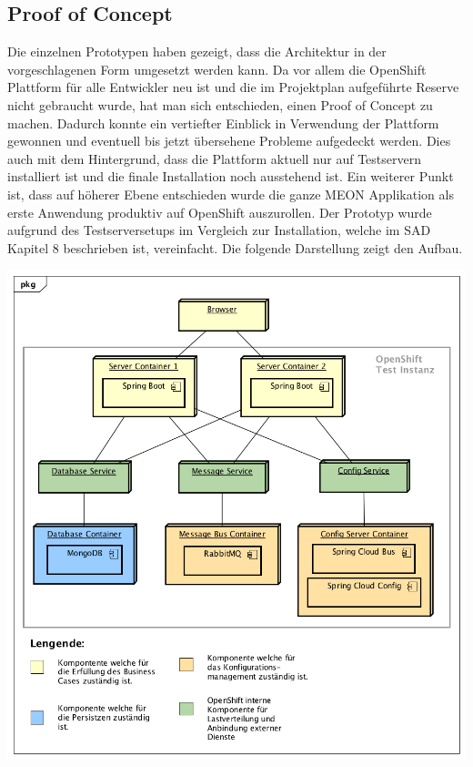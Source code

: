 \subsection{Proof of Concept}

Die einzelnen Prototypen haben gezeigt, dass die Architektur in der vorgeschlagenen Form umgesetzt werden kann. Da vor allem die OpenShift Plattform für alle Entwickler neu ist und die im Projektplan aufgeführte Reserve nicht gebraucht wurde, hat man sich entschieden, einen Proof of Concept zu machen. Dadurch konnte ein vertiefter Einblick in Verwendung der Plattform gewonnen und eventuell bis jetzt übersehene Probleme aufgedeckt werden. Dies auch mit dem Hintergrund, dass die Plattform aktuell nur auf Testservern installiert ist und die finale Installation noch ausstehend ist. Ein weiterer Punkt ist, dass auf höherer Ebene entschieden wurde die ganze MEON Applikation als erste Anwendung produktiv auf OpenShift auszurollen.\newline\newline
Der Prototyp wurde aufgrund des Testserversetups im Vergleich zur Installation, welche im SAD Kapitel 8 beschrieben ist, vereinfacht. Die folgende Darstellung zeigt den Aufbau.

\begin{center}
	\includegraphics[scale=0.60]{PrototypDeployment.png}
\end{center}

